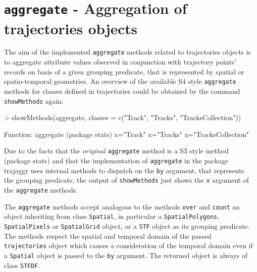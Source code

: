 \documentclass[12pt, oneside, a4paper]{scrbook}
\newcommand{\pkg}[1]{{\normalfont\fontseries{b}\selectfont #1}}
\let\code=\texttt
\newcommand{\codeintitles}[1]{{\tt #1}} %
\begin{document}
\section{\codeintitles{aggregate} - Aggregation of \pkg{trajectories} objects}
\label{sec:aggreate}

The aim of the implemented \code{aggregate} methods related to \pkg{trajectories} objects is to aggregate attribute values observed in conjunction with trajectory points' records on basis of a given grouping predicate, that is represented by spatial or spatio-temporal geometries.
An overview of the available S4 style \code{aggregate} methods for classes defined in \pkg{trajectories} could be obtained by the command \code{showMethods} again:
\par\medskip

\begin{small}
\begin{Schunk}
\begin{Sinput}
> showMethods(aggregate, classes = c("Track", "Tracks", "TracksCollection"))
\end{Sinput}
\begin{Soutput}
Function: aggregate (package stats)
x="Track"
x="Tracks"
x="TracksCollection"
\end{Soutput}
\end{Schunk}
\end{small}

Due to the facts that the \textit{original} \code{aggregate} method is a S3 style method (package \pkg{stats}) and that the implementation of \code{aggregate} in the package \pkg{trajaggr} uses internal methods to dispatch on the \code{by} argument, that represents the grouping predicate, the output of \code{showMethods} just shows the \code{x} argument of the \code{aggregate} methods. 
\par\medskip

The \code{aggregate} methods accept analogous to the methods \code{over} and \code{count} an  object inheriting from class \code{Spatial}, in particular a \code{SpatialPolygons}, \code{SpatialPixels} or \code{SpatialGrid} object, or a \code{STF} object as its grouping predicate.
The methods respect the spatial and temporal domain of the passed \code{trajectories} object which causes a consideration of the temporal domain even if a \code{Spatial} object is passed to the \code{by} argument. 
The returned object is always of class \code{STFDF}.
\par\medskip
\end{document}
